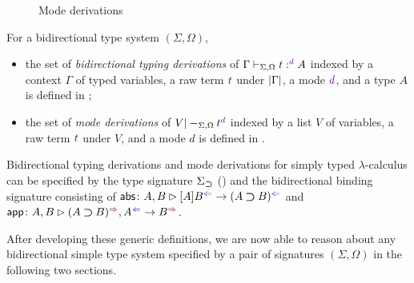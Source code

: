\begin{definition}
\begin{figure}
    \caption{Mode derivations}
    \label{fig:mode-derivations}
  \end{figure}
  For a bidirectional type system $(\Sigma, \Omega)$,
  \begin{itemize}
    \item the set of \emph{bidirectional typing derivations} of $\Gamma \vdash_{\Sigma, \Omega} t :^\dir{d} A$ indexed by a context $\Gamma$ of typed variables, a raw term $\isTerm{t}$ under $\left|\Gamma\right|$, a mode $\dir{d}$, and a type $A$ is defined in ;
    \item the set of \emph{mode derivations} of $V |-_{\Sigma, \Omega} t^\dir{d}$ indexed by a list $V$ of variables, a raw term $\isTerm{t}$ under $V$, and a mode $d$ is defined in .
  \end{itemize}
\end{definition}

\begin{example}
  Bidirectional typing derivations and mode derivations for simply typed $\lambda$-calculus can be specified by the type signature $\Sigma_{\mathbin{\bm{\supset}}}$ () and the bidirectional binding signature consisting of $\mathsf{abs}\colon A , B \rhd [A]B^{\chk} \to (A \bto B)^{\chk}$ and $\mathsf{app}\colon A, B \rhd (A \bto B)^{\syn}, A^{\chk} \to B^{\syn}$.
\end{example}

After developing these generic definitions, we are now able to reason about any bidirectional simple type system specified by a pair of signatures $(\Sigma, \Omega)$ in the following two sections.
